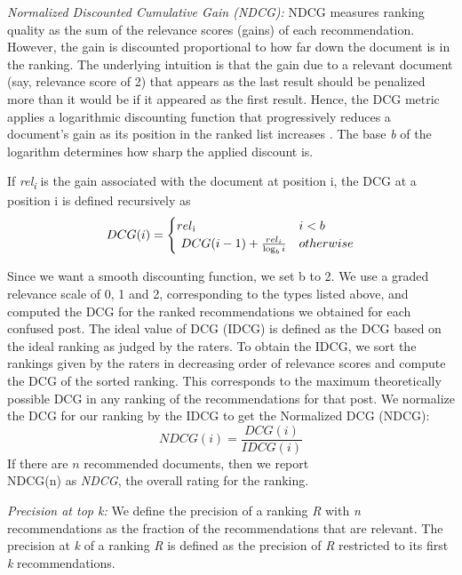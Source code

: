 \documentclass{edm_template}
\begin{document}
\textit{Normalized Discounted Cumulative Gain (NDCG):}
NDCG measures ranking quality as the sum of the relevance scores (gains) of each recommendation. However, the gain is discounted proportional to how far down the document is in the ranking. The underlying intuition is that the gain due to a relevant document (say, relevance score of 2) that appears as the last result should be penalized more than it would be if it appeared as the first result. Hence, the DCG metric applies a logarithmic discounting function that progressively reduces a document's gain as its position in the ranked list increases \cite{ndcgcite}. The base \textit{b} of the logarithm determines how sharp the applied discount is.

If \textit{rel\textsubscript i} is the gain associated with the document at position i, the DCG at a position i is defined recursively as
\begin{equation}
DCG(i) =
\begin{cases}
rel \textsubscript i & i < b  \\
\ DCG(i-1) + \frac{rel_i}{\log_b{i}} & otherwise \\
\end{cases}
\end{equation}

Since we want a smooth discounting function, we set b to 2. We use a graded relevance scale of 0, 1 and 2, corresponding to the types listed above, and computed the DCG for the ranked recommendations we obtained for each confused post. The ideal value of DCG (IDCG) is defined as the DCG based on the ideal ranking as judged by the raters. To obtain the IDCG, we sort the rankings given by the raters in decreasing order of relevance scores and compute the DCG of the sorted ranking. This corresponds to the maximum theoretically possible DCG in any ranking of the recommendations for that post. We normalize the DCG for our ranking by the IDCG to get the Normalized DCG (NDCG):
\begin{equation}
NDCG(i) = \frac{DCG(i)}{IDCG(i)}
\end{equation}
If there are $n$ recommended documents, then we report\\NDCG(n) as \emph{NDCG}, the overall rating for the ranking. 

\textit{Precision at top k:}
We define the precision of a ranking \textit{R} with \textit{n} recommendations as the fraction of the recommendations that are relevant. The precision at \textit{k} of a ranking \textit{R} is defined as the precision of \textit{R} restricted to its first \textit{k} recommendations. 
\end{document}
